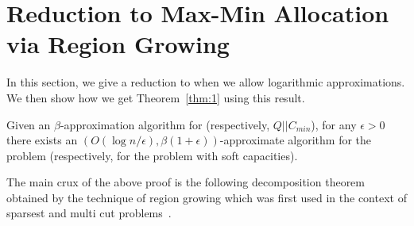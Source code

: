 \section{Reduction to Max-Min Allocation via Region Growing}\label{fsec:regiongrowing}
In this section, we give a reduction to \cckp  when we allow logarithmic approximations. We then show how we get Theorem~\ref{thm:1} using this result.
\begin{theorem}\label{fthm:weakred}
	Given an $\beta$-approximation algorithm for \cckp (respectively, $Q||C_{min}$), for any $\epsilon>0$ there exists an $\left(O(\log n/\epsilon), \beta(1+\epsilon)\right)$-approximate algorithm for the \mckc problem (respectively, for the \mckc problem with soft capacities).
\end{theorem}

The main crux of the above proof is the following decomposition theorem obtained by the technique of region growing which was first used in the context of sparsest and multi cut problems~\cite{LeightonR99,GargVY96}.


